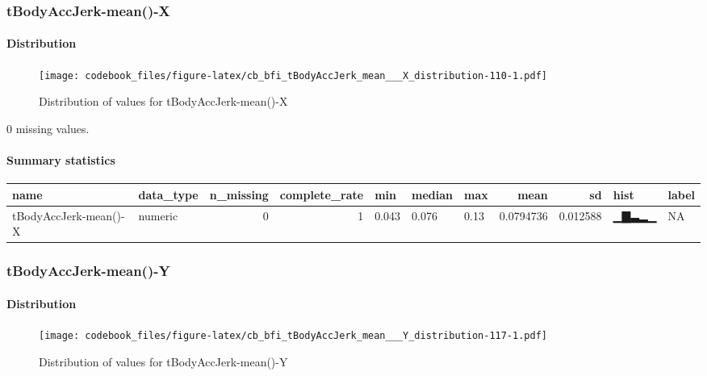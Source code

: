 \documentclass[
]{article}
\begin{document}
\hypertarget{tBodyAccJerk_mean___X}{%
\subsubsection{tBodyAccJerk-mean()-X}\label{tBodyAccJerk_mean___X}}

\hypertarget{tBodyAccJerk_mean___X_distribution}{%
\paragraph{Distribution}\label{tBodyAccJerk_mean___X_distribution}}

\begin{figure}
\centering
\texttt{[image: codebook\_files/figure-latex/cb\_bfi\_tBodyAccJerk\_mean\_\_\_X\_distribution-110-1.pdf]}
\caption{Distribution of values for tBodyAccJerk-mean()-X}
\end{figure}

0 missing values.

\hypertarget{tBodyAccJerk_mean___X_summary}{%
\paragraph{Summary statistics}\label{tBodyAccJerk_mean___X_summary}}

\begin{longtable}[]{@{}llrrlllrrll@{}}
\toprule
name & data\_type & n\_missing & complete\_rate & min & median & max &
mean & sd & hist & label \\
\midrule
\endhead
tBodyAccJerk-mean()-X & numeric & 0 & 1 & 0.043 & 0.076 & 0.13 &
0.0794736 & 0.012588 & ▁▇▃▂▁ & NA \\
\bottomrule
\end{longtable}

\hypertarget{tBodyAccJerk_mean___Y}{%
\subsubsection{tBodyAccJerk-mean()-Y}\label{tBodyAccJerk_mean___Y}}

\hypertarget{tBodyAccJerk_mean___Y_distribution}{%
\paragraph{Distribution}\label{tBodyAccJerk_mean___Y_distribution}}

\begin{figure}
\centering
\texttt{[image: codebook\_files/figure-latex/cb\_bfi\_tBodyAccJerk\_mean\_\_\_Y\_distribution-117-1.pdf]}
\caption{Distribution of values for tBodyAccJerk-mean()-Y}
\end{figure}
\end{document}
